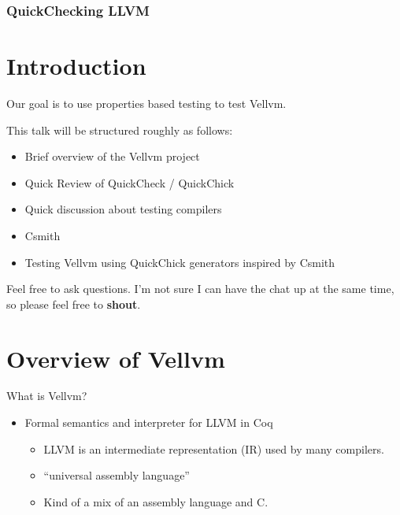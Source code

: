\documentclass{beamer}
\author{
  Beck, Calvin\\
  \href{mailto:hobbes@seas.upenn.edu}{hobbes@seas.upenn.edu}
  \and\\~\\
  Zakowski, Yannick\\
  \href{mailto:zakowski@seas.upenn.edu}{zakowski@seas.upenn.edu}
}
\begin{document}
\begin{frame}
  \frametitle{QuickChecking LLVM}
  \maketitle
\end{frame}

\section{Introduction}

\begin{frame}

  Our goal is to use properties based testing to test Vellvm.

  This talk will be structured roughly as follows:
  
  \begin{itemize}
  \item Brief overview of the Vellvm project
  \item Quick Review of QuickCheck / QuickChick
  \item Quick discussion about testing compilers
  \item Csmith
  \item Testing Vellvm using QuickChick generators inspired by Csmith
  \end{itemize}

  Feel free to ask questions. I'm not sure I can have the chat up at
  the same time, so please feel free to {\bf shout}.
\end{frame}

\section{Overview of Vellvm}

\begin{frame}
  What is Vellvm?

  \begin{itemize}
  \item Formal semantics and interpreter for LLVM in Coq
    \begin{itemize}
    \item LLVM is an intermediate representation (IR) used by many
      compilers.
    \item ``universal assembly language''
    \item Kind of a mix of an assembly language and C.
    \end{itemize}
  \end{itemize}
\end{frame}
\end{document}
